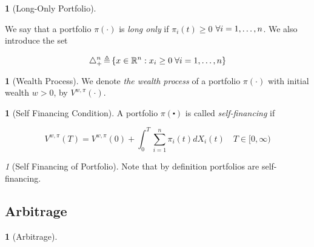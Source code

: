 \documentclass[british]{amsart}
\numberwithin{equation}{section}
\numberwithin{figure}{section}
\theoremstyle{plain}
\theoremstyle{definition}
\newtheorem{defn}[thm]{\protect\definitionname}
\theoremstyle{plain}
\theoremstyle{plain}
\theoremstyle{plain}
\theoremstyle{remark}
\newtheorem{rem}[thm]{\protect\remarkname}
\theoremstyle{plain}
\providecommand{\definitionname}{Definition}
\providecommand{\remarkname}{Remark}
\newcommand{\defeq}{\mathop{\triangleq}}
\begin{document}
\begin{defn} [Long-Only Portfolio]
	\label{def:longonlyportfolio}

	We say that a portfolio $\pi(\cdot)$ is \textit{long only} if 
	$\pi_{i}(t) \ge 0$ $\forall i=1,\dots,n$. We also introduce the set 

	\begin{equation}
		\triangle_{+}^{n} \defeq 
		\left\{ x\in\mathbb{R}^{n}:x_{i}\ge0\;\forall \rangei \right\} 
	\end{equation}

\end{defn}


\begin{defn} [Wealth Process]
	
	We denote \textit{the wealth process} of a portfolio $\pi(\cdot)$ with initial 
	wealth $w > 0$, by $V^{w,\pi}(\cdot)$.

\end{defn}

\begin{defn} [Self Financing Condition]
	
	A portfolio $\pi(\centerdot)$ is called \textit{self-financing} if 
	
	\begin{equation}
		V^{w,\pi}(T) = V^{w,\pi}(0) + \int_{0}^{T} \sum_{i=1}^{n} \pi_{i}(t) dX_{i}(t)
		\quad T \in [0, \infty)
	\end{equation}

\end{defn}

\begin{rem} [Self Financing of Portfolio]
	Note that by definition portfolios are self-financing.
\end{rem}

\subsection{Arbitrage}

\begin{defn} [Arbitrage]
	\label{def:portfolio}
\end{defn}



\printbibliography
\end{document}
